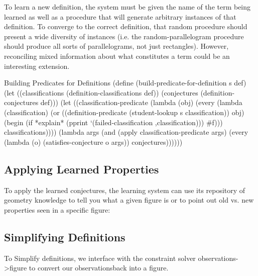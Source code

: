 To learn a new definition, the system must be given the name of the
term being learned as well as a procedure that will generate arbitrary
instances of that definition. To converge to the correct definition,
that random procedure should present a wide diversity of instances
(i.e. the random-parallelogram procedure should produce all sorts of
parallelograms, not just rectangles). However, reconciling mixed
information about what constitutes a term could be an interesting
extension.

\begin{code-listing}{Building Predicates for Definitions}
(define (build-predicate-for-definition s def)
  (let ((classifications (definition-classifications def))
        (conjectures (definition-conjectures def)))
    (let ((classification-predicate
           (lambda (obj)
             (every
              (lambda (classification)
                (or ((definition-predicate (student-lookup s classification))
                     obj)
                    (begin (if *explain*
                               (pprint `(failed-classification
                                         ,classification)))
                           #f)))
              classifications))))
      (lambda args
        (and (apply classification-predicate args)
             (every (lambda (o) (satisfies-conjecture o args))
                    conjectures))))))
\end{code-listing}

\subsection{Applying Learned Properties}

To apply the learned conjectures, the learning system can use its
repository of geometry knowledge to tell you what a given figure is or
to point out old vs. new properties seen in a specific figure:


\subsection{Simplifying Definitions}

To Simplify definitions, we interface with the constraint solver
observations->figure to convert our observationsback into a figure.

